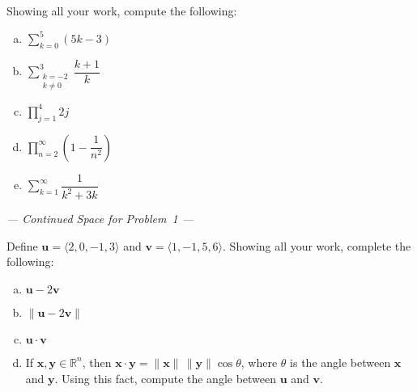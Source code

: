 \documentclass[11pt,letterpaper]{article}
\begin{document}

 Showing all your work, compute the following:
	\begin{enumerate}[(a)]
	\item $\displaystyle \sum_{k=0}^5 (5k - 3)$
	\item $\displaystyle \sum_{\substack{k= -2 \\ k \neq 0}}^3 \dfrac{k + 1}{k}$
	\item $\displaystyle \prod_{j=1}^4 2j$
	\item $\displaystyle \prod_{n=2}^\infty \left(1 - \dfrac{1}{n^2} \right)$ 
	\item $\displaystyle \sum_{k=1}^\infty \dfrac{1}{k^2 + 3k}$ 
	\end{enumerate}

\newpage 
\begin{center} {\itshape --- Continued Space for Problem~1 ---} \end{center}
\newpage



 Define $\mathbf{u}= \langle 2, 0, -1, 3 \rangle$ and $\mathbf{v}= \langle 1, -1, 5, 6 \rangle$. Showing all your work, complete the following:
	\begin{enumerate}[(a)]
	\item $\mathbf{u} - 2 \mathbf{v}$
	\item $\| \mathbf{u} - 2\mathbf{v} \|$
	\item $\mathbf{u} \cdot \mathbf{v}$
	\item If $\mathbf{x}, \mathbf{y} \in \mathbb{R}^n$, then $\mathbf{x} \cdot \mathbf{y}= \| \mathbf{x} \| \, \| \mathbf{y} \| \cos \theta$, where $\theta$ is the angle between $\mathbf{x}$ and $\mathbf{y}$. Using this fact, compute the angle between $\mathbf{u}$ and $\mathbf{v}$. 
	\end{enumerate}



\newpage
\end{document}
